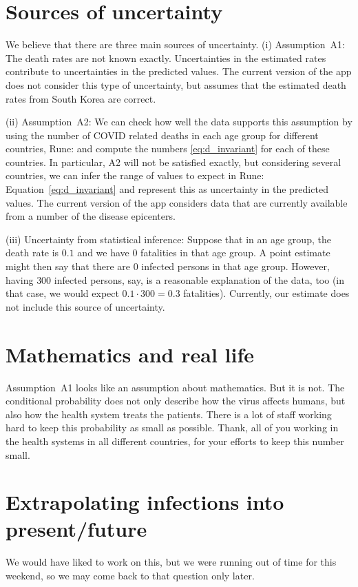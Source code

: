 \documentclass[a4paper]{article}
\newcommand\Rune[1]{{\color{blue}Rune: #1}}
\newcommand\Niklas[1]{{\color{Fuchsia}Niklas: #1}}
\begin{document}


\section{Sources of uncertainty} \label{sec:uncert}
We believe that there are 
three main sources of uncertainty. 
(i) Assumption~A1: 
The death rates are not known exactly. Uncertainties in the 
estimated rates
contribute to uncertainties in the
predicted values.
The current version of the app does not consider
this type of uncertainty, but assumes 
that the estimated death rates from South Korea are correct.

(ii) Assumption~A2: We can check 
how well the data supports 
this assumption by using 
the number of COVID related deaths in each age group for different countries, 
\Rune{and compute the numbers \eqref{eq:d_invariant} for each of these countries.}
In particular, A2 will not be satisfied exactly, but 
considering several countries, we can 
infer the range of values to expect in \Rune{Equation~\eqref{eq:d_invariant}}
and represent this as uncertainty in the predicted values. 
The current version of the app considers data that are currently available from a number of the disease epicenters.

(iii) Uncertainty from statistical inference: 
Suppose that in an age group, the death rate is $0.1$ and we have 
$0$ fatalities in that age group.
A point estimate might then say that there are $0$ infected persons
in that age group. However, having $300$ infected persons, say,
is a reasonable explanation of the data, too (in that case, we would expect $0.1\cdot 300 = 0.3$ fatalities).
Currently, our estimate does not include this source of uncertainty.


\section{Mathematics and real life}
Assumption~A1 looks like an assumption about mathematics. 
But it is not. 
The conditional probability does not 
only describe how
the virus affects humans, 
but also how the health system treats the patients. 
There is a lot of staff working hard to 
keep this probability as small as possible. 
Thank, all of you working in the health systems in all different countries, for 
your efforts to keep this number small. 




\section{Extrapolating infections into present/future}
We would have liked to work on this, but we were running out of time for this weekend, so we may come back to that question only later.
\end{document}
